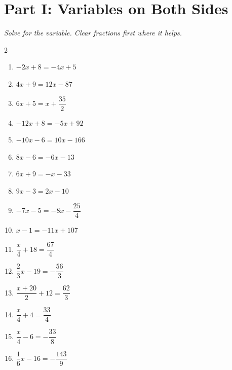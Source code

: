 \documentclass[11pt]{article}
\begin{document}
\section*{Part I: Variables on Both Sides}
\noindent\textit{Solve for the variable. Clear fractions first where it helps.}
\begin{multicols}{2}
\begin{enumerate}
  \item $-2x + 8 = -4x + 5$
  \vspace{2.0cm}
  \item $4x + 9 = 12x - 87$
  \vspace{2.0cm}
  \item $6x + 5 = x + \dfrac{35}{2}$
  \vspace{2.0cm}
  \item $-12x + 8 = -5x + 92$
  \vspace{2.0cm}
  \item $-10x - 6 = 10x - 166$
  \vspace{2.0cm}
  \item $8x - 6 = -6x - 13$
  \vspace{2.0cm}
  \item $6x + 9 = -x - 33$
  \vspace{2.0cm}
  \item $9x - 3 = 2x - 10$
  \vspace{2.0cm}
  \item $-7x - 5 = -8x - \dfrac{25}{4}$
  \vspace{2.0cm}
  \item $x - 1 = -11x + 107$
  \vspace{2.0cm}
  \item $\dfrac{x}{4} + 18 = \dfrac{67}{4}$
  \vspace{2.0cm}
  \item $\dfrac{2}{3}x - 19 = -\dfrac{56}{3}$
  \vspace{2.0cm}
  \item $\dfrac{x + 20}{2} + 12 = \dfrac{62}{3}$
  \vspace{2.0cm}
  \item $\dfrac{x}{4} + 4 = \dfrac{33}{4}$
  \vspace{2.0cm}
  \item $\dfrac{x}{4} - 6 = -\dfrac{33}{8}$
  \vspace{2.0cm}
  \item $\dfrac{1}{6}x - 16 = -\dfrac{143}{9}$
  \vspace{2.0cm}
\end{enumerate}
\end{multicols}
\end{document}
